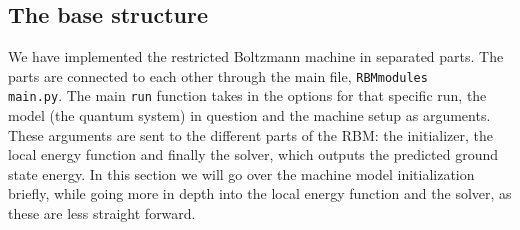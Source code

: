 \subsection{The base structure}

We have implemented the restricted Boltzmann machine in separated parts. The parts are connected to each other through the main file, \texttt{RBMmodules\\main.py}. The main \texttt{run} function takes in the options for that specific run, the model (the quantum system) in question and the machine setup as arguments. These arguments are sent to the different parts of the RBM: the initializer, the local energy function and finally the solver, which outputs the predicted ground state energy. In this section we will go over the machine model initialization briefly, while going more in depth into the local energy function and the solver, as these are less straight forward.

